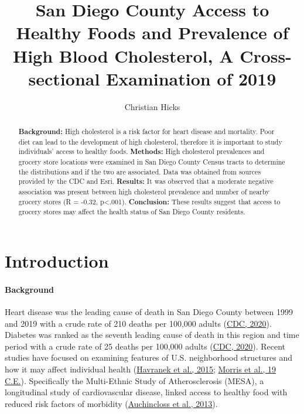 \documentclass[]{elsarticle} %
\begin{document}
\begin{frontmatter}

  \title{San Diego County Access to Healthy Foods and Prevalence of High
Blood Cholesterol, A Cross-sectional Examination of 2019}
    \author[San Diego State University School of Public
Health]{Christian Hicks}
      
  \begin{abstract}
  \textbf{Background:} High cholesterol is a risk factor for heart
  disease and mortality. Poor diet can lead to the development of high
  cholesterol, therefore it is important to study individuals' access to
  healthy foods. \textbf{Methods:} High cholesterol prevalences and
  grocery store locations were examined in San Diego County Census
  tracts to determine the distributions and if the two are associated.
  Data was obtained from sources provided by the CDC and Esri.
  \textbf{Results:} It was observed that a moderate negative association
  was present between high cholesterol prevalence and number of nearby
  grocery stores (R = -0.32, p\textless.001). \textbf{Conclusion:} These
  results suggest that access to grocery stores may affect the health
  status of San Diego County residents.
  \end{abstract}
  
 \end{frontmatter}

\hypertarget{introduction}{%
\section{Introduction}\label{introduction}}

\hypertarget{background}{%
\paragraph{Background}\label{background}}

Heart disease was the leading cause of death in San Diego County between
1999 and 2019 with a crude rate of 210 deaths per 100,000 adults
(\protect\hyperlink{ref-wonder2019}{CDC, 2020}). Diabetes was ranked as
the seventh leading cause of death in this region and time period with a
crude rate of 25 deaths per 100,000 adults
(\protect\hyperlink{ref-wonder2019}{CDC, 2020}). Recent studies have
focused on examining features of U.S. neighborhood structures and how it
may affect individual health
(\protect\hyperlink{ref-havranek2015}{Havranek et al., 2015};
\protect\hyperlink{ref-morris19}{Morris et al., 19 C.E.}). Specifically
the Multi-Ethnic Study of Atherosclerosis (MESA), a longitudinal study
of cardiovascular disease, linked access to healthy food with reduced
risk factors of morbidity
(\protect\hyperlink{ref-auchincloss2013}{Auchincloss et al., 2013}).
\end{document}
